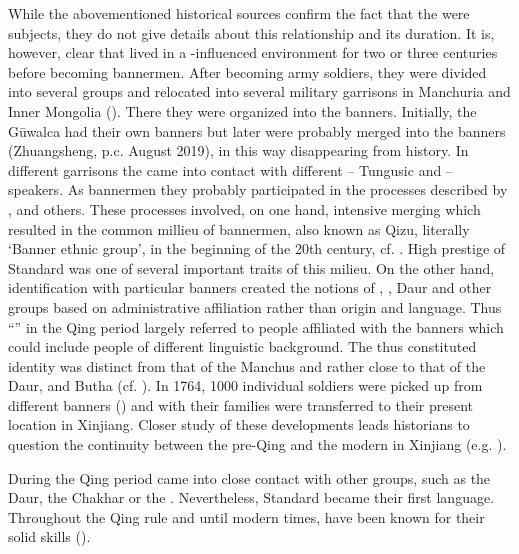 \documentclass[output=paper,colorlinks,citecolor=brown]{langscibook}
\begin{document}
While the abovementioned historical sources confirm the fact that the  were  subjects, they do not give details about this relationship and its duration. It is, however, clear that  lived in a -influenced environment for two or three centuries before becoming  bannermen. After becoming  army soldiers, they were divided into several groups and relocated into several military garrisons in Manchuria and Inner Mongolia (\citealt[36]{Gorelova2002}). There they were organized into the  banners. Initially, the Gūwalca had their own banners but later were probably merged into the  banners (Zhuangsheng, p.c. August 2019), in this way disappearing from history. In different garrisons the  came into contact with different – Tungusic and  – speakers.  As  bannermen they probably participated in the processes described by \citet[9--12]{Atwood2005}, and others. These processes involved, on one hand, intensive merging which resulted in the common millieu of  bannermen, also known as Qizu, literally ‘Banner ethnic group’, in the beginning of the 20th century, cf. \citet{Chengzhi2021}. High prestige of Standard  was one of several important traits of this milieu. On the other hand, identification with particular banners created the notions of , , Daur and other groups based on administrative affiliation rather than origin and language. Thus “” in the Qing period largely referred to people affiliated with the  banners which could include people of different linguistic background. The thus constituted  identity was distinct from that of the Manchus and rather close to that of the Daur,  and Butha (cf. \citealt[85]{Elliott2001}). In 1764, 1000 individual soldiers were picked up from different  banners (\citealt[9]{Sárközi2019}) and with their families were transferred to their present location in Xinjiang. Closer study of these developments leads historians to question the continuity between the pre-Qing  and the modern  in Xinjiang (e.g. \citealt[257--268]{Chengzhi2012}).

During the Qing period  came into close contact with other  groups, such as the Daur, the Chakhar or the . Nevertheless, Standard  became their first language. Throughout the Qing rule and until modern times,  have been known for their solid  skills (\citealt[51]{Zhuangsheng2019}).
\end{document}
